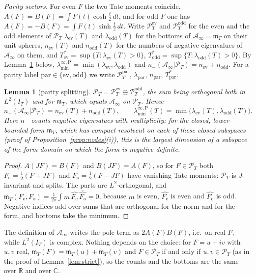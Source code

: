 \documentclass[11pt]{amsart}
\newtheorem{lemma}[theorem]{Lemma}
\theoremstyle{definition}
\theoremstyle{remark}
\newcommand{\C}{\mathbb C}
\newcommand{\R}{\mathbb R}
\newcommand{\PT}{\mathcal P_T}
\newcommand{\IT}{I_T}
\newcommand{\Ainf}{\mathcal A_\infty}
\newcommand{\mT}{\mathfrak m_T}
\newcommand{\laminfP}{\lambda^{\infty,\mathrm P}_{\min}}
\begin{document}
\emph{Parity sectors.} For even $F$ the two Tate moments coincide,
$A(F)=B(F)=\int F(t)\cosh\frac t2\,dt$, and for odd $F$ one has $A(F)=-B(F)=\int F(t)\sinh\frac t2\,dt$.
Write $\PT^{\mathrm{ev}}$ and $\PT^{\mathrm{odd}}$ for the even and the odd elements of $\PT$
$\lambda_{\mathrm{ev}}(T)$ and
$\lambda_{\mathrm{odd}}(T)$ for the bottoms of $\Ainf=\mT$ on their unit spheres,
$n_{\mathrm{ev}}(T)$ and $n_{\mathrm{odd}}(T)$ for the numbers of negative eigenvalues of $\Ainf$ on them,
and $T^*_{\mathrm{ev}}=\sup\{T:\lambda_{\mathrm{ev}}(T)>0\}$, $T^*_{\mathrm{odd}}=\sup\{T:\lambda_{\mathrm{odd}}(T)>0\}$.
By Lemma~\ref{lem:parity} below, $\laminfP=\min(\lambda_{\mathrm{ev}},\lambda_{\mathrm{odd}})$
and $n_-(\Ainf|\PT)=n_{\mathrm{ev}}+n_{\mathrm{odd}}$. For a parity label $\mathrm{par}\in\{\mathrm{ev},\mathrm{odd}\}$
we write $\PT^{\mathrm{par}}$, $\lambda_{\mathrm{par}}$, $n_{\mathrm{par}}$, $T^*_{\mathrm{par}}$.

\begin{lemma}[parity splitting]\label{lem:parity}
$\PT=\PT^{\mathrm{ev}}\oplus\PT^{\mathrm{odd}}$, the sum being orthogonal both in
$L^2(\IT)$ and for $\mT$, which equals $\Ainf$ on $\PT$. Hence
\[
n_-(\Ainf|\PT)=n_{\mathrm{ev}}(T)+n_{\mathrm{odd}}(T),\qquad
\laminfP(T)=\min\big(\lambda_{\mathrm{ev}}(T),\lambda_{\mathrm{odd}}(T)\big).
\]
Here $n_-$ counts negative eigenvalues with multiplicity; for the closed,
lower-bounded form $\mT$, which has compact resolvent on each of these closed subspaces (proof of
Proposition~\ref{prop:nodes}(i)), this is the largest dimension of a subspace of the form domain on
which the form is negative definite.
\end{lemma}
\begin{proof}
$A(JF)=B(F)$ and $B(JF)=A(F)$, so for $F\in\PT$ both $F_{\mathrm e}=\frac12(F+JF)$ and
$F_{\mathrm o}=\frac12(F-JF)$ have vanishing Tate moments: $\PT$ is $J$-invariant and splits. The
parts are $L^2$-orthogonal, and
$\mT(F_{\mathrm e},F_{\mathrm o})=\frac1{2\pi}\int m\,\widehat{F_{\mathrm e}}\,\overline{\widehat{F_{\mathrm o}}}=0$,
because $m$ is even, $\widehat{F_{\mathrm e}}$ is even and $\widehat{F_{\mathrm o}}$ is odd. Negative
indices add over sums that are orthogonal for the norm and for the form, and bottoms take the minimum.
\end{proof}
The definition of $\Ainf$ writes the pole term as $2A(F)B(F)$, i.e.\ on real $F$, while $L^2(\IT)$ is
complex. Nothing depends on the choice: for $F=u+iv$ with $u,v$ real, $\mT(F)=\mT(u)+\mT(v)$
and $F\in\PT$ if and only if $u,v\in\PT$ (as in the proof of Lemma~\ref{lem:strict}), so the counts and
the bottoms are the same over $\R$ and over $\C$.
\end{document}
